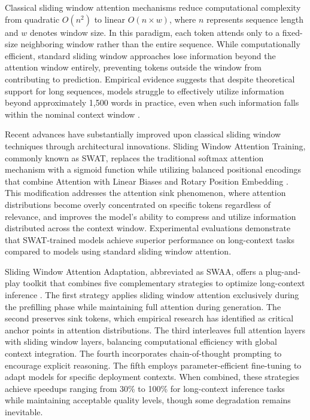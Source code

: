 \documentclass[11pt,letterpaper]{article}
\begin{document}
Classical sliding window attention mechanisms reduce computational complexity from quadratic $O(n^2)$ to linear $O(n \times w)$, where $n$ represents sequence length and $w$ denotes window size. In this paradigm, each token attends only to a fixed-size neighboring window rather than the entire sequence. While computationally efficient, standard sliding window approaches lose information beyond the attention window entirely, preventing tokens outside the window from contributing to prediction. Empirical evidence suggests that despite theoretical support for long sequences, models struggle to effectively utilize information beyond approximately 1,500 words in practice, even when such information falls within the nominal context window \cite{press2022train}.

Recent advances have substantially improved upon classical sliding window techniques through architectural innovations. Sliding Window Attention Training, commonly known as SWAT, replaces the traditional softmax attention mechanism with a sigmoid function while utilizing balanced positional encodings that combine Attention with Linear Biases and Rotary Position Embedding \cite{chen2025swat}. This modification addresses the attention sink phenomenon, where attention distributions become overly concentrated on specific tokens regardless of relevance, and improves the model's ability to compress and utilize information distributed across the context window. Experimental evaluations demonstrate that SWAT-trained models achieve superior performance on long-context tasks compared to models using standard sliding window attention.

Sliding Window Attention Adaptation, abbreviated as SWAA, offers a plug-and-play toolkit that combines five complementary strategies to optimize long-context inference \cite{zhang2024swaa}. The first strategy applies sliding window attention exclusively during the prefilling phase while maintaining full attention during generation. The second preserves sink tokens, which empirical research has identified as critical anchor points in attention distributions. The third interleaves full attention layers with sliding window layers, balancing computational efficiency with global context integration. The fourth incorporates chain-of-thought prompting to encourage explicit reasoning. The fifth employs parameter-efficient fine-tuning to adapt models for specific deployment contexts. When combined, these strategies achieve speedups ranging from 30\% to 100\% for long-context inference tasks while maintaining acceptable quality levels, though some degradation remains inevitable.
\end{document}
